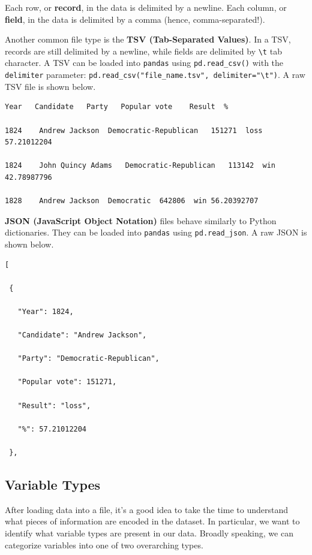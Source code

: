 \documentclass[
  letterpaper,
  DIV=11,
  numbers=noendperiod]{scrreprt}
\begin{document}
Each row, or \textbf{record}, in the data is delimited by a newline.
Each column, or \textbf{field}, in the data is delimited by a comma
(hence, comma-separated!).

Another common file type is the \textbf{TSV (Tab-Separated Values)}. In
a TSV, records are still delimited by a newline, while fields are
delimited by \texttt{\textbackslash{}t} tab character. A TSV can be
loaded into \texttt{pandas} using \texttt{pd.read\_csv()} with the
\texttt{delimiter} parameter:
\texttt{pd.read\_csv("file\_name.tsv",\ delimiter="\textbackslash{}t")}.
A raw TSV file is shown below.

\begin{verbatim}
Year   Candidate   Party   Popular vote    Result  %

1824    Andrew Jackson  Democratic-Republican   151271  loss    57.21012204

1824    John Quincy Adams   Democratic-Republican   113142  win 42.78987796

1828    Andrew Jackson  Democratic  642806  win 56.20392707
\end{verbatim}

\textbf{JSON (JavaScript Object Notation)} files behave similarly to
Python dictionaries. They can be loaded into \texttt{pandas} using
\texttt{pd.read\_json}. A raw JSON is shown below.

\begin{verbatim}
[

 {

   "Year": 1824,

   "Candidate": "Andrew Jackson",

   "Party": "Democratic-Republican",

   "Popular vote": 151271,

   "Result": "loss",

   "%": 57.21012204

 },
\end{verbatim}

\hypertarget{variable-types}{%
\subsection{Variable Types}\label{variable-types}}

After loading data into a file, it's a good idea to take the time to
understand what pieces of information are encoded in the dataset. In
particular, we want to identify what variable types are present in our
data. Broadly speaking, we can categorize variables into one of two
overarching types.
\end{document}
